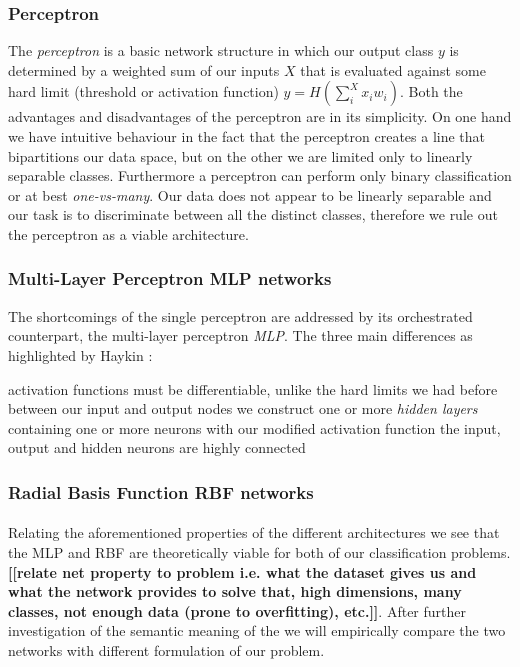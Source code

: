 \documentclass[11pt,a4paper]{article}
\begin{document}
\subsubsection{Perceptron}
The \textit{perceptron} is a basic network structure in which our output class \(y\) is determined by a weighted sum of our inputs \(X\) that is evaluated against some hard limit (threshold or activation function) \(y = H(\sum_{i}^{X} x_i w_i)\). Both the advantages and disadvantages of the perceptron are in its simplicity. On one hand we have intuitive behaviour in the fact that the perceptron creates a line that bipartitions our data space, but on the other we are limited only to linearly separable classes. Furthermore a perceptron can perform only binary classification or at best \textit{one-vs-many}. Our data does not appear to be linearly separable and our task is to discriminate between all the distinct classes, therefore we rule out the perceptron as a viable architecture.

\subsubsection{Multi-Layer Perceptron MLP networks}
The shortcomings of the single perceptron are addressed by its orchestrated counterpart, the multi-layer perceptron \textit{MLP}. The three main differences as highlighted by Haykin \autocite{Haykin1998}:

\begin{outline}
  \1 activation functions must be differentiable, unlike the hard limits we had before
  \1 between our input and output nodes we construct one or more \textit{hidden layers} containing one or more neurons with our modified activation function
  \1 the input, output and hidden neurons are highly connected
\end{outline}

\subsubsection{Radial Basis Function RBF networks}


\paragraph{}
Relating the aforementioned properties of the different architectures we see that the MLP and RBF are theoretically viable for both of our classification problems. \textbf{[[relate net property to problem i.e. what the dataset gives us and what the network provides to solve that, high dimensions, many classes, not enough data (prone to overfitting), etc.]]}. After further investigation of the semantic meaning of the we will empirically compare the two networks with different formulation of our problem. %
\end{document}
